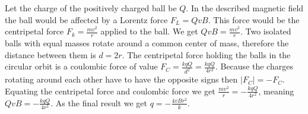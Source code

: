 \solueng
Let the charge of the positively charged ball be $Q$. In the described magnetic field the ball would be affected by a Lorentz force $F_L=QvB$. This force would be the centripetal force $F_k=\frac{mv^2}{r}$ applied to the ball. We get $QvB=\frac{mv^2}{r}$. Two isolated balls with equal masses rotate around a common center of mass, therefore the distance between them is $d=2r$. The centripetal force holding the balls in the circular orbit is a coulombic force of value $F_C=\frac{kqQ}{d^2}=\frac{kqQ}{4r^2}$. Because the charges rotating around each other have to have the opposite signs then $|F_C|=-F_C$. Equating the centripetal force and coulombic force we get $\frac{mv^2}{r}=-\frac{kqQ}{4r^2}$, meaning $QvB=-\frac{kqQ}{4r^2}$. As the final result we get $q=-\frac{4vBr^2}{k}$.
\probend